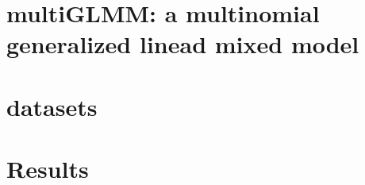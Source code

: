 \documentclass[12pt, %
               openright, %
               oneside, %
               a4paper, %
               chapter=TITLE, %
               section=TITLE, %
               brazil,
               english %
]{abntex2}
\begin{document}
\chapter{multiGLMM: a multinomial generalized linead
  mixed model}
\label{cap:model}

\chapter{datasets}
\label{cap:datasets}

\chapter{Results}
\label{cap:results}

\end{document}
